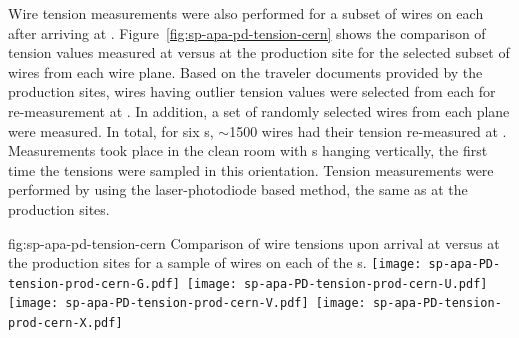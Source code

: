 Wire tension measurements were also performed for a subset of wires on each  after arriving at . Figure~\ref{fig:sp-apa-pd-tension-cern} shows the comparison of tension values measured at  versus at the production site for the selected subset of wires from each wire plane. Based on the traveler documents provided by the production sites, wires having outlier tension values were selected from each  for re-measurement at . In addition, a set of randomly selected wires from each plane were measured. In total, for six s, $\sim$1500 wires had their tension re-measured at . Measurements took place in the clean room with s hanging vertically, the first time the tensions were sampled in this orientation. Tension measurements were performed by using the laser-photodiode based method, the same as at the production sites. %






\begin{dunefigure}{fig:sp-apa-pd-tension-cern}
{Comparison of wire tensions upon arrival at  versus at the production sites for a sample of wires on each of the  s.}
\mbox{\texttt{[image: sp-apa-PD-tension-prod-cern-G.pdf]} %
\texttt{[image: sp-apa-PD-tension-prod-cern-U.pdf]}} \\
\vspace{3mm}
\mbox{\texttt{[image: sp-apa-PD-tension-prod-cern-V.pdf]} %
\texttt{[image: sp-apa-PD-tension-prod-cern-X.pdf]}}
\end{dunefigure}

